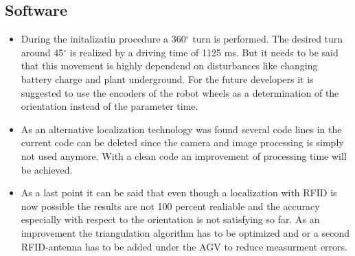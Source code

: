 \subsection{Software}
\begin{itemize}
\item During the initalizatin procedure a 360$^\circ$ turn is performed. The desired turn around 45$^\circ$ is realized by a driving time of 1125 ms. But it needs to be said that this movement is highly dependend on disturbances like changing battery charge and plant underground. For the future developers it is suggested to use the encoders of the robot wheels as a determination of the orientation instead of the parameter time.
\item As an alternative localization technology was found several code lines in the current code can be deleted since the camera and image processing is simply not used anymore. With a clean code an improvement of processing time will be achieved.
\item As a last point it can be said that even though a localization with RFID is now possible the results are not 100 percent realiable and the accuracy especially with respect to the orientation is not satisfying so far. As an improvement the triangulation algorithm has to be optimized and or a second RFID-antenna has to be added under the AGV to reduce measurment errors.
\end{itemize}